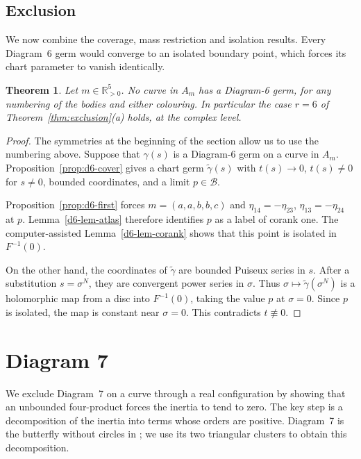 \documentclass[Threeside,11pt]{article}
\newtheorem{theorem}{Theorem}[section]
\theoremstyle{definition}
\theoremstyle{remark}
\numberwithin{equation}{section}
\theoremstyle{remark}
\newcommand{\Rp}{\mathbb{R}_{>0}}
\begin{document}
\subsection{Exclusion}

We now combine the coverage, mass restriction and isolation results.
Every Diagram~6 germ would converge to an isolated boundary point, which
forces its chart parameter to vanish identically.

\begin{theorem}\label{thm:d6}
Let $m\in\Rp^5$.  No curve in $A_m$ has a Diagram-6 germ, for any numbering of the bodies and
either colouring.  In particular the case $r=6$ of Theorem~\ref{thm:exclusion}(a) holds, at the
complex level.
\end{theorem}

\begin{proof}
{
The symmetries at the beginning of the section allow us to use the
numbering above.  Suppose that $\gamma(s)$ is a Diagram-6 germ on a curve
in $A_m$.  Proposition~\ref{prop:d6-cover} gives a chart germ
$\tilde\gamma(s)$ with $t(s)\to0$, $t(s)\ne0$ for $s\ne0$, bounded
coordinates, and a limit $p\in\mathcal B$.

Proposition~\ref{prop:d6-first} forces $m=(a,a,b,b,c)$ and
$\eta_{14}=-\eta_{23}$, $\eta_{13}=-\eta_{24}$ at $p$.
Lemma~\ref{d6-lem-atlas} therefore identifies $p$ as a label of corank one.
The computer-assisted Lemma~\ref{d6-lem-corank} shows that this point is
isolated in $F^{-1}(0)$.

On the other hand, the coordinates of $\tilde\gamma$ are bounded Puiseux
series in $s$.  After a substitution $s=\sigma^N$, they are convergent
power series in $\sigma$.  Thus $\sigma\mapsto\tilde\gamma(\sigma^N)$
is a holomorphic map from a disc into $F^{-1}(0)$, taking the value $p$
at $\sigma=0$.  Since $p$ is isolated, the map is constant near
$\sigma=0$.  This contradicts $t\not\equiv0$.
}
\end{proof}







\section{Diagram 7}\label{sec:d7}

We exclude Diagram~7 on a curve through a real configuration by showing that
an unbounded four-product forces the inertia to tend to zero.  The key step is
a decomposition of the inertia into terms whose orders are positive.
Diagram~7 is the butterfly without circles in \cite[\S7.4]{AK}; we use its
two triangular clusters to obtain this decomposition.
\end{document}
